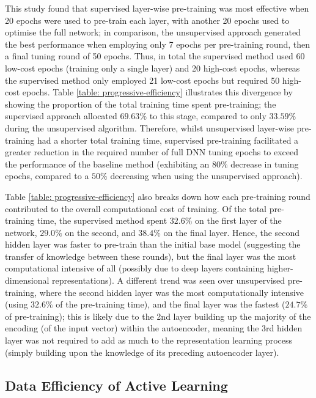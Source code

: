 \documentclass[a4paper, 11pt]{report}
\begin{document}
    This study found that supervised layer-wise pre-training was most effective when 20 epochs were used to pre-train each layer, with another 20 epochs used to optimise the full network; in comparison, the unsupervised approach generated the best performance when employing only 7 epochs per pre-training round, then a final tuning round of 50 epochs. Thus, in total the supervised method used 60 low-cost epochs (training only a single layer) and 20 high-cost epochs, whereas the supervised method only employed 21 low-cost epochs but required 50 high-cost epochs. Table \ref{table: progressive-efficiency} illustrates this divergence by showing the proportion of the total training time spent pre-training; the supervised approach allocated $69.63\%$ to this stage, compared to only $33.59\%$ during the unsupervised algorithm. Therefore, whilst unsupervised layer-wise pre-training had a shorter total training time, supervised pre-training facilitated a greater reduction in the required number of full DNN tuning epochs to exceed the performance of the baseline method (exhibiting an $80\%$ decrease in tuning epochs, compared to a $50\%$ decreasing when using the unsupervised approach).

    Table \ref{table: progressive-efficiency} also breaks down how each pre-training round contributed to the overall computational cost of training. Of the total pre-training time, the supervised method spent $32.6\%$ on the first layer of the network, $29.0\%$ on the second, and $38.4\%$ on the final layer. Hence, the second hidden layer was faster to pre-train than the initial base model (suggesting the transfer of knowledge between these rounds), but the final layer was the most computational intensive of all (possibly due to deep layers containing higher-dimensional representations). A different trend was seen over unsupervised pre-training, where the second hidden layer was the most computationally intensive (using $32.6\%$ of the pre-training time), and the final layer was the fastest ($24.7\%$ of pre-training); this is likely due to the 2nd layer building up the majority of the encoding (of the input vector) within the autoencoder, meaning the 3rd hidden layer was not required to add as much to the representation learning process (simply building upon the knowledge of its preceding autoencoder layer).


    \subsection{Data Efficiency of Active Learning}
\end{document}
